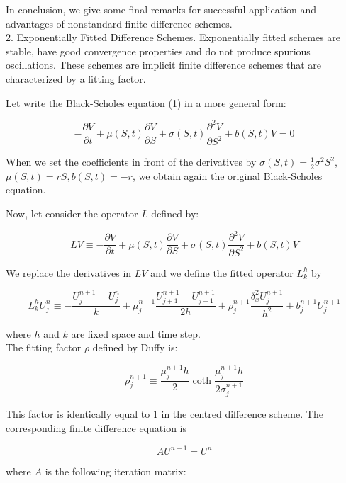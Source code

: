 \documentclass[10pt]{article}
\begin{document}
In conclusion, we give some final remarks for successful application and advantages of nonstandard finite difference schemes.\\
2. Exponentially Fitted Difference Schemes. Exponentially fitted schemes are stable, have good convergence properties and do not produce spurious oscillations. These schemes are implicit finite difference schemes that are characterized by a fitting factor.

Let write the Black-Scholes equation (1) in a more general form:


\begin{equation*}
-\frac{\partial V}{\partial t}+\mu(S, t) \frac{\partial V}{\partial S}+\sigma(S, t) \frac{\partial^{2} V}{\partial S^{2}}+b(S, t) V=0 \tag{2}
\end{equation*}


When we set the coefficients in front of the derivatives by $\sigma(S, t)=\frac{1}{2} \sigma^{2} S^{2}$, $\mu(S, t)=r S, b(S, t)=-r$, we obtain again the original Black-Scholes equation.

Now, let consider the operator $L$ defined by:

$$
L V \equiv-\frac{\partial V}{\partial t}+\mu(S, t) \frac{\partial V}{\partial S}+\sigma(S, t) \frac{\partial^{2} V}{\partial S^{2}}+b(S, t) V
$$

We replace the derivatives in $L V$ and we define the fitted operator $L_{k}^{h}$ by

$$
L_{k}^{h} U_{j}^{n} \equiv-\frac{U_{j}^{n+1}-U_{j}^{n}}{k}+\mu_{j}^{n+1} \frac{U_{j+1}^{n+1}-U_{j-1}^{n+1}}{2 h}+\rho_{j}^{n+1} \frac{\delta_{x}^{2} U_{j}^{n+1}}{h^{2}}+b_{j}^{n+1} U_{j}^{n+1}
$$

where $h$ and $k$ are fixed space and time step.\\
The fitting factor $\rho$ defined by Duffy is:


\begin{equation*}
\rho_{j}^{n+1} \equiv \frac{\mu_{j}^{n+1} h}{2} \operatorname{coth} \frac{\mu_{j}^{n+1} h}{2 \sigma_{j}^{n+1}} \tag{3}
\end{equation*}


This factor is identically equal to 1 in the centred difference scheme. The corresponding finite difference equation is


\begin{equation*}
A U^{n+1}=U^{n} \tag{4}
\end{equation*}


where $A$ is the following iteration matrix:
\end{document}
